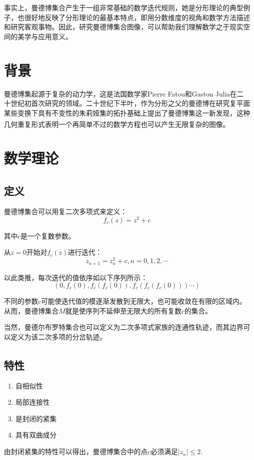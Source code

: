 \documentclass{ctexart}
\begin{document}
事实上，曼德博集合产生于一组非常基础的数学迭代规则，她是分形理论的典型例子，也很好地反映了分形理论的最基本特点，即用分数维度的视角和数学方法描述和研究客观事物。因此，研究曼德博集合图像，可以帮助我们理解数学之于现实空间的美学与应用意义。

\section{背景}
曼德博集起源于复杂的动力学，这是法国数学家Pierre Fatou和Gaston Julia在二十世纪初首次研究的领域。二十世纪下半叶，作为分形之父的曼德博在研究复平面某些变换下具有不变性的朱莉娅集的拓扑基础上提出了曼德博集这一新发现，这种几何重复形式表明一个再简单不过的数学方程也可以产生无限复杂的图像。\textsuperscript{\cite{mandelbort_wiki}}

\section{数学理论}
\subsection{定义\textsuperscript{\cite{set_wiki}}\textsuperscript{\cite{set_wolfram}}}
曼德博集合可以用复二次多项式来定义：
$$f_c(z)=z^2+c$$

其中$c$是一个复数参数。

从$z=0$开始对$f_c(z)$进行迭代：
$$z_{n+1}=z^2_n+c,n=0,1,2,\cdots$$

以此类推，每次迭代的值依序如以下序列所示：
$$(0,f_c(0),f_c(f_c(0)),f_c(f_c(f_c(0)))\cdots)$$

不同的参数$c$可能使迭代值的模逐渐发散到无限大，也可能收敛在有限的区域内。从而，曼德博集合$M$就是使序列不延伸至无限大的所有复数$c$的集合。

当然，曼德尔布罗特集合也可以定义为二次多项式家族的连通性轨迹，而其边界可以定义为该二次多项的分岔轨迹。

\subsection{特性\textsuperscript{\cite{set_wiki}}}
\begin{enumerate}
	\item 自相似性
	\item 局部连接性
	\item 是封闭的紧集
	\item 具有双曲成分
\end{enumerate}

由封闭紧集的特性可以得出，曼德博集合中的点$c$必须满足$|z_n|\le 2$.
\end{document}
